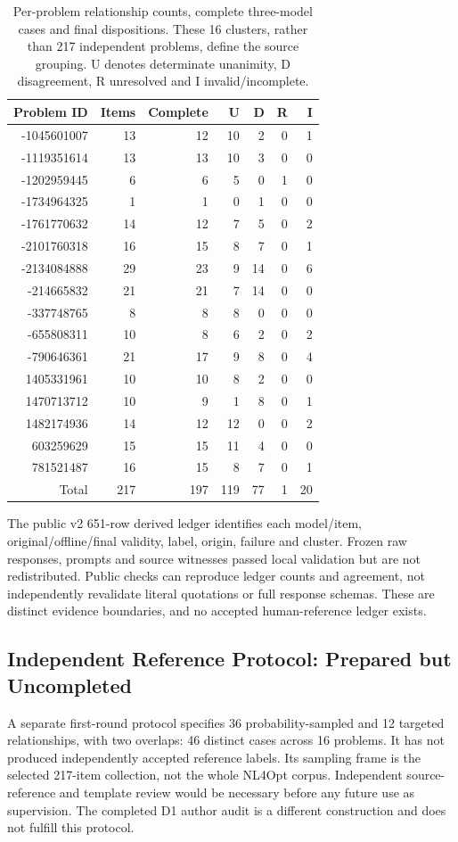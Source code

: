 \begin{table}[htbp]\centering\small
\caption{Per-problem relationship counts, complete three-model cases and final dispositions. These 16 clusters, rather than 217 independent problems, define the source grouping. U denotes determinate unanimity, D disagreement, R unresolved and I invalid/incomplete.}\label{tab:relationship-clusters}
\begin{tabular}{@{}rrrrrrr@{}}\toprule
Problem ID & Items & Complete & U & D & R & I\\\midrule
-1045601007 & 13 & 12 & 10 & 2 & 0 & 1\\
-1119351614 & 13 & 13 & 10 & 3 & 0 & 0\\
-1202959445 & 6 & 6 & 5 & 0 & 1 & 0\\
-1734964325 & 1 & 1 & 0 & 1 & 0 & 0\\
-1761770632 & 14 & 12 & 7 & 5 & 0 & 2\\
-2101760318 & 16 & 15 & 8 & 7 & 0 & 1\\
-2134084888 & 29 & 23 & 9 & 14 & 0 & 6\\
-214665832 & 21 & 21 & 7 & 14 & 0 & 0\\
-337748765 & 8 & 8 & 8 & 0 & 0 & 0\\
-655808311 & 10 & 8 & 6 & 2 & 0 & 2\\
-790646361 & 21 & 17 & 9 & 8 & 0 & 4\\
1405331961 & 10 & 10 & 8 & 2 & 0 & 0\\
1470713712 & 10 & 9 & 1 & 8 & 0 & 1\\
1482174936 & 14 & 12 & 12 & 0 & 0 & 2\\
603259629 & 15 & 15 & 11 & 4 & 0 & 0\\
781521487 & 16 & 15 & 8 & 7 & 0 & 1\\
\midrule
Total & 217 & 197 & 119 & 77 & 1 & 20\\\bottomrule
\end{tabular}\end{table}

The public v2 651-row derived ledger identifies each model/item, original/offline/final validity, label, origin, failure and cluster. Frozen raw responses, prompts and source witnesses passed local validation but are not redistributed. Public checks can reproduce ledger counts and agreement, not independently revalidate literal quotations or full response schemas. These are distinct evidence boundaries, and no accepted human-reference ledger exists.

\subsection{Independent Reference Protocol: Prepared but Uncompleted}
\label{app:future-reference}
A separate first-round protocol specifies 36 probability-sampled and 12 targeted relationships, with two overlaps: 46 distinct cases across 16 problems. It has not produced independently accepted reference labels. Its sampling frame is the selected 217-item collection, not the whole NL4Opt corpus. Independent source-reference and template review would be necessary before any future use as supervision. The completed D1 author audit is a different construction and does not fulfill this protocol.
